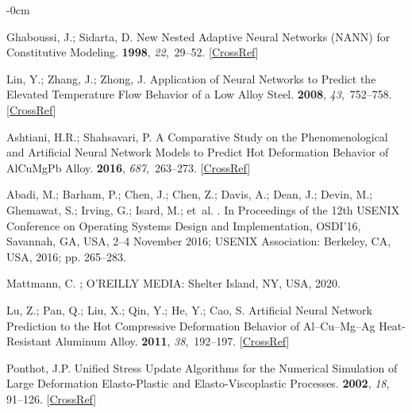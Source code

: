 \documentclass[algorithms,article,accept,pdftex,oneauthors]{Definitions/mdpi}
\begin{document}
\begin{adjustwidth}{-\extralength}{0cm}
\begin{thebibliography}{999}
Ghaboussi, J.; Sidarta, D.
\newblock New Nested Adaptive Neural Networks ({{NANN}}) for Constitutive
Modeling.
 {\bf 1998}, {\em 22},~29--52. [\href{http://dx.doi.org/10.1016/S0266-352X(97)00034-7}{CrossRef}]

Lin, Y.; Zhang, J.; Zhong, J.
\newblock Application of Neural Networks to Predict the Elevated Temperature
Flow Behavior of a Low Alloy Steel.
 {\bf 2008}, {\em 43},~752--758. [\href{http://dx.doi.org/10.1016/j.commatsci.2008.01.039}{CrossRef}]

Ashtiani, H.R.; Shahsavari, P.
\newblock A Comparative Study on the Phenomenological and Artificial Neural
Network Models to Predict Hot Deformation Behavior of {{AlCuMgPb}} Alloy.
 {\bf 2016}, {\em
687},~263--273. [\href{http://dx.doi.org/10.1016/j.jallcom.2016.04.300}{CrossRef}]

Abadi, M.; Barham, P.; Chen, J.; Chen, Z.; Davis, A.; Dean, J.; Devin, M.;
Ghemawat, S.; Irving, G.; Isard, M.;  et~al.
.
\newblock In Proceedings of the 12th {{USENIX}} Conference
on {{Operating Systems Design}} and {{Implementation}}, {OSDI}'16, {Savannah, GA, USA, 2--4 November 2016;} 
{USENIX Association: Berkeley, CA, }
{USA}, 2016; pp. 265--283.

Mattmann, C.
; {O'REILLY MEDIA}: Shelter Island, NY, USA,  2020.

Lu, Z.; Pan, Q.; Liu, X.; Qin, Y.; He, Y.; Cao, S.
\newblock Artificial Neural Network Prediction to the Hot Compressive
Deformation Behavior of {{Al}}--{{Cu}}--{{Mg}}--{{Ag}} Heat-Resistant
Aluminum Alloy.
 {\bf 2011}, {\em
38},~192--197. [\href{http://dx.doi.org/10.1016/j.mechrescom.2011.02.015}{CrossRef}]

Ponthot, J.P.
\newblock Unified Stress Update Algorithms for the Numerical Simulation of
Large Deformation Elasto-Plastic and Elasto-Viscoplastic Processes.
 {\bf 2002}, \emph{18}, 91--126. [\href{http://dx.doi.org/10.1016/S0749-6419(00)00097-8}{CrossRef}]


\end{thebibliography}
\end{adjustwidth}
\end{document}
